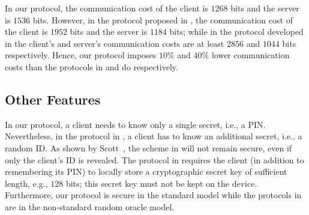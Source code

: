 In our protocol, the communication cost of the client is $1268$ bits and the server is $1536$ bits. However, in the protocol proposed in \cite{WangW18},  the communication cost of the client is $1952$ bits and the server is  $1184$ bits; while in the protocol developed in \cite{JareckiJKSS21} the client's and server's communication costs are at least $2856$ and $1044$ bits respectively. Hence, our protocol imposes $10\%$ and $40\%$ lower communication costs than the protocols in \cite{WangW18} and \cite{JareckiJKSS21} do respectively.


\subsection{Other Features}

 In our protocol, a client needs to know only a single secret, i.e., a  PIN. Nevertheless, in the protocol in \cite{WangW18}, a client has to know an additional secret, i.e., a random ID. As shown by Scott~\cite{Scott12a}, the scheme in \cite{WangW18} will not remain secure, even if only the client's ID is revealed. The protocol in \cite{JareckiJKSS21} requires the client (in addition to remembering its PIN) to locally store a cryptographic secret key of sufficient length, e.g., $128$ bits; this secret key must not be kept on the device. 
 Furthermore, our protocol is secure in the standard model while the protocols in \cite{WangW18,JareckiJKSS21} are in the non-standard random oracle model. 

